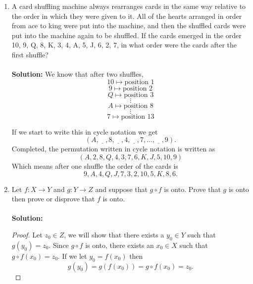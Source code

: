 \documentclass[12pt,letterpaper]{article}
\theoremstyle{plain}
\theoremstyle{definition}
\begin{document}
\begin{enumerate}[1.]
For the following proof, we will assume that $f$ and $f^{-1}$ are defined on the same domain.  
\begin{proof} Since $f(s+t)=f(s)f(t)$ for all $s$ and $t$ in the domain of $f$
\[
xy=f(f^{-1}(x))f(f^{-1}(y))=f(f^{-1}(x)+f^{-1}(y))
\]
If we apply $f^{-1}$ to both sides we get 
\[f^{-1}(xy)=f^{-1}(f(f^{-1}(x)+f^{-1}(y)))=f^{-1}(x)+f^{-1}(y)\]
\end{proof}
\item  A card shuffling machine always rearranges cards in the same way relative to the order in which they were given to it. All of the hearts arranged in order from ace to king were put into the machine, and then the shuffled cards were put into the machine again to be shuffled. If the cards emerged in the order 10, 9, Q, 8, K, 3, 4, A, 5, J, 6, 2, 7, in what order were the cards after the first shuffle?\\
\ \\
{\bf Solution:}
We know that after two shuffles, 
\[10 \mapsto \text{position }1\]\[9 \mapsto \text{position }2\]
\[Q \mapsto \text{position }3\]
\[\vdots\]
\[A \mapsto \text{position }8\]
\[\vdots \]
\[7 \mapsto \text{position }13\]

If we start to write this in cycle notation we get 
\[(A,\underline{\ \ \ \ }, 8,\underline{\ \ \ \ }, 4, \underline{\ \ \ \ }, 7, \ldots,\underline{\ \ \ \ }, 9).\]
Completed, the permutation written in cycle notation is written as 
\[(A, 2, 8, Q, 4, 3, 7, 6, K, J, 5, 10, 9)\]
Which means after one shuffle the order of the cards is \[9, A, 4, Q, J , 7, 3, 2, 10, 5, K, 8, 6.\]

\item Let $f:X\rightarrow Y$ and $g:Y\rightarrow Z$ and suppose that $g\circ f$ is onto. Prove that $g$ is onto then prove or disprove that $f$ is onto. \\
\ \\
{\bf Solution:}
\begin{proof}
Let $z_0\in Z$, we will show that there exists a $y_0\in Y$ such that $g(y_0)=z_0$. Since $g\circ f$ is onto, there exists an $x_0\in X$ such that $g\circ f(x_0)=z_0$. If we let $y_0=f(x_0)$ then \[g(y_0)=g(f(x_0))=g\circ f(x_0)=z_0.\]  

\end{proof}
\end{enumerate}
\end{document}
